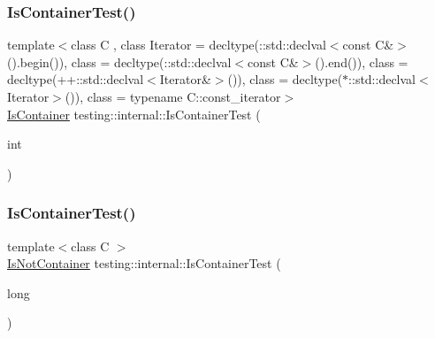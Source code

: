 \mbox{\label{namespacetesting_1_1internal_a764748b94f628bdd1dcd39dc81e8b71f}} 
\subsubsection{\texorpdfstring{Is\+Container\+Test()}{IsContainerTest()}\hspace{0.1cm}{\footnotesize\ttfamily [1/2]}}
{\footnotesize\ttfamily template$<$class C , class Iterator  = decltype(\+::std\+::declval$<$const C\&$>$().\+begin()), class  = decltype(\+::std\+::declval$<$const C\&$>$().\+end()), class  = decltype(++\+::std\+::declval$<$\+Iterator\&$>$()), class  = decltype($\ast$\+::std\+::declval$<$\+Iterator$>$()), class  = typename C\+::const\+\_\+iterator$>$ \\
\hyperlink{namespacetesting_1_1internal_ad8f0c2883245f1df2a53618a49f0deb3}{Is\+Container} testing\+::internal\+::\+Is\+Container\+Test (\begin{DoxyParamCaption}\item[{int}]{ }\end{DoxyParamCaption})}

\mbox{\label{namespacetesting_1_1internal_af545a2ae928b8a9e7581978234464275}} 
\subsubsection{\texorpdfstring{Is\+Container\+Test()}{IsContainerTest()}\hspace{0.1cm}{\footnotesize\ttfamily [2/2]}}
{\footnotesize\ttfamily template$<$class C $>$ \\
\hyperlink{namespacetesting_1_1internal_abf080521ce135deb510e0a7830fd3d33}{Is\+Not\+Container} testing\+::internal\+::\+Is\+Container\+Test (\begin{DoxyParamCaption}\item[{long}]{ }\end{DoxyParamCaption})}

\mbox{\label{namespacetesting_1_1internal_a4bd96b7fa6486802d33ddc217af55a39}} 
